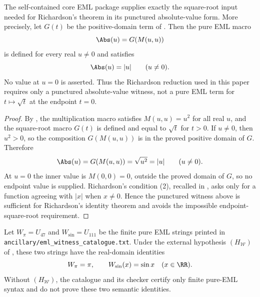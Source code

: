\begin{theorem}
\label{thm:positive-core-nonnegative-root-boundary}
\label{thm:eml-punctured-richardson-core}
The self-contained core EML package supplies exactly the square-root input needed
for Richardson's theorem in its punctured absolute-value form.  More precisely,
let \(G(t)\) be the positive-domain term of
.  Then the pure EML macro
\[
  \Abs(u)=G(M(u,u))
\]
is defined for every real \(u\ne0\) and satisfies
\[
  \Abs(u)=|u|\qquad(u\ne0).
\]
No value at \(u=0\) is asserted.  Thus the Richardson reduction used in this
paper requires only a punctured absolute-value witness, not a pure EML term for
\(t\mapsto\sqrt t\) at the endpoint \(t=0\).
\end{theorem}

\begin{proof}
By , the multiplication macro satisfies
\(M(u,u)=u^2\) for all real \(u\), and the square-root macro \(G(t)\) is defined
and equal to \(\sqrt t\) for \(t>0\).  If \(u\ne0\), then \(u^2>0\), so the
composition \(G(M(u,u))\) is in the proved positive domain of \(G\).  Therefore
\[
  \Abs(u)=G(M(u,u))=\sqrt{u^2}=|u|\qquad(u\ne0).
\]
At \(u=0\) the inner value is \(M(0,0)=0\), outside the proved domain of \(G\), so
no endpoint value is supplied.  Richardson's condition (2), recalled in
, asks only for a function agreeing
with \(|x|\) when \(x\ne0\).  Hence the punctured witness above is sufficient for
Richardson's identity theorem and avoids the impossible endpoint-square-root
requirement.
\end{proof}

\begin{lemma}
\label{lem:eml-pi-sine-witnesses}
Let \(W_{\pi}=U_{47}\) and \(W_{\sin}=U_{111}\) be the finite pure EML strings
printed in \texttt{ancillary/eml\_witness\_catalogue.txt}.  Under the external
hypothesis \((H_{\mathcal W})\) of , these two strings have the
real-domain identities
\[
  W_{\pi}=\pi,
  \qquad
  W_{\sin}(x)=\sin x\quad(x\in\RR).
\]
Without \((H_{\mathcal W})\), the catalogue and its checker certify only finite
pure-EML syntax and do not prove these two semantic identities.
\end{lemma}

